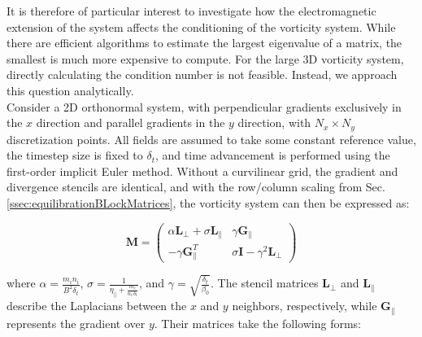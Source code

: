 It is therefore of particular interest to investigate how the electromagnetic extension of the system affects the conditioning of the vorticity system. While there are efficient algorithms to estimate the largest eigenvalue of a matrix, the smallest is much more expensive to compute. For the large 3D vorticity system, directly calculating the condition number is not feasible. Instead, we approach this question analytically. \\

Consider a 2D orthonormal system, with perpendicular gradients exclusively in the $x$ direction and parallel gradients in the $y$ direction, with $N_x \times N_y$ discretization points. All fields are assumed to take some constant reference value, the timestep size is fixed to $\delta_t$, and time advancement is performed using the first-order implicit Euler method. Without a curvilinear grid, the gradient and divergence stencils are identical, and with the row/column scaling from Sec. \ref{ssec:equilibrationBLockMatrices}, the vorticity system can then be expressed as:


\begin{equation}
	\textbf{M} = 
	\begin{pmatrix}
		\alpha \textbf{L}_\perp + \sigma \textbf{L}_\parallel & \gamma \textbf{G}_\parallel \\ -\gamma \textbf{G}_\parallel^T & \sigma \textbf{I} - \gamma^2\textbf{L}_\perp
	\end{pmatrix}
\end{equation}

where $\alpha = \frac{m_in_i}{B^2\delta_t}$, $\sigma = \frac{1}{\eta_\parallel + \frac{m_e}{n_e \delta_t}}$, and $\gamma = \sqrt{\frac{\delta_t }{\beta_0}}$. The stencil matrices $\textbf{L}_\perp$ and $\textbf{L}_\parallel$ describe the Laplacians between the $x$ and $y$ neighbors, respectively, while $\textbf{G}_\parallel$ represents the gradient over $y$. Their matrices take the following forms:

